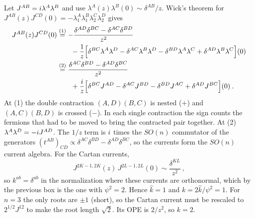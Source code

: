 \begin{tcolorbox}[breakable]
	\begin{remark}
		Let $J^{AB}=i\lambda^{A}\lambda^{B}$ and use $\lambda^{A}(z)\lambda^{B}(0)\sim\delta^{AB}/z$. Wick's theorem for $J^{AB}(z)J^{CD}(0)=-\lambda^{A}_{1}\lambda^{B}_{1}\lambda^{C}_{2}\lambda^{D}_{2}$ gives
		\begin{align*}
			J^{AB}(z)J^{CD}(0)&\overset{(1)}{=}-\frac{\delta^{AD}\delta^{BC}-\delta^{AC}\delta^{BD}}{z^{2}}\\
			&\qquad-\frac{1}{z}\Bigl[\delta^{BC}\lambda^{A}\lambda^{D}-\delta^{AC}\lambda^{B}\lambda^{D}-\delta^{BD}\lambda^{A}\lambda^{C}+\delta^{AD}\lambda^{B}\lambda^{C}\Bigr](0)\\
			&\overset{(2)}{=}\frac{\delta^{AC}\delta^{BD}-\delta^{AD}\delta^{BC}}{z^{2}}\\
			&\qquad+\frac{i}{z}\Bigl[\delta^{BC}J^{AD}-\delta^{AC}J^{BD}-\delta^{BD}J^{AC}+\delta^{AD}J^{BC}\Bigr](0)\:.
		\end{align*}
		At (1) the double contraction $(A,D)(B,C)$ is nested ($+$) and $(A,C)(B,D)$ is crossed ($-$). In each single contraction the sign counts the fermions that had to be moved to bring the contracted pair together. At (2) $\lambda^{A}\lambda^{D}=-i J^{AD}$. The $1/z$ term is $i$ times the $SO(n)$ commutator of the generators $(t^{AB})_{CD}\propto\delta^{AC}\delta^{BD}-\delta^{AD}\delta^{BC}$, so the currents form the $SO(n)$ current algebra. For the Cartan currents,
		\begin{equation*}
			J^{2K-1,2K}(z)\,J^{2L-1,2L}(0)\sim\frac{\delta^{KL}}{z^{2}}\:,
		\end{equation*}
		so $k^{ab}=\delta^{ab}$ in the normalization where these currents are orthonormal, which by the previous box is the one with $\psi^{2}=2$. Hence $\hat{k}=1$ and $k=2\hat{k}/\psi^{2}=1$. For $n=3$ the only roots are $\pm1$ (short), so the Cartan current must be rescaled to $2^{1/2}J^{12}$ to make the root length $\sqrt{2}$. Its OPE is $2/z^{2}$, so $k=2$.
	\end{remark}
\end{tcolorbox}

